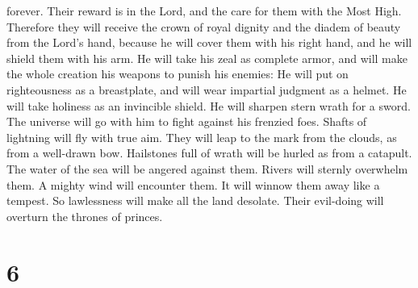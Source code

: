 forever. Their reward is in the Lord, and the care for them with the
Most High.  Therefore they will receive the crown of
royal dignity and the diadem of beauty from the Lord's hand, because he
will cover them with his right hand, and he will shield them with his
arm.  He will take his zeal as complete armor, and will
make the whole creation his weapons to punish his enemies:
 He will put on righteousness as a breastplate, and will
wear impartial judgment as a helmet.  He will take
holiness as an invincible shield.  He will sharpen stern
wrath for a sword. The universe will go with him to fight against his
frenzied foes.  Shafts of lightning will fly with true
aim. They will leap to the mark from the clouds, as from a well-drawn
bow.  Hailstones full of wrath will be hurled as from a
catapult. The water of the sea will be angered against them. Rivers will
sternly overwhelm them.  A mighty wind will encounter
them. It will winnow them away like a tempest. So lawlessness will make
all the land desolate. Their evil-doing will overturn the thrones of
princes.

\hypertarget{section-5}{%
\section{6}\label{section-5}}

